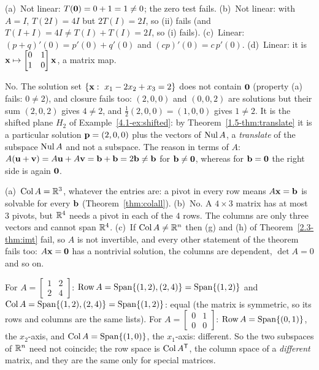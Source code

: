 \documentclass[11pt]{article}
\begin{document}
\begin{description}[leftmargin=0pt,itemsep=5pt]
  \item[Knowledge Check \ref{kc:islinear}.] (a)~Not linear: $T(\mathbf{0})=0+1=1\neq0$; the zero test fails. (b)~Not linear: with $A=I$, $T(2I)=4I$ but $2T(I)=2I$, so (ii) fails (and $T(I+I)=4I\neq T(I)+T(I)=2I$, so (i) fails). (c)~Linear: $(p+q)'(0)=p'(0)+q'(0)$ and $(cp)'(0)=c\,p'(0)$. (d)~Linear: it is $\mathbf{x}\mapsto\begin{bmatrix}0&1\\1&0\end{bmatrix}\mathbf{x}$, a matrix map.
  \item[Pause and think \ref{think:shifted}.] No. The solution set $\{\bv{x}:\ x_1-2x_2+x_3=2\}$ does not contain $\mathbf{0}$ (property (a) fails: $0\neq2$), and closure fails too: $(2,0,0)$ and $(0,0,2)$ are solutions but their sum $(2,0,2)$ gives $4\neq2$, and $\tfrac12(2,0,0)=(1,0,0)$ gives $1\neq2$. It is the shifted plane $H_2$ of Example~\ref{4.1-ex:shifted}: by Theorem~\ref{1.5-thm:translate} it is a particular solution $\mathbf{p}=(2,0,0)$ plus the vectors of $\operatorname{Nul} A$, a \emph{translate} of the subspace $\operatorname{Nul} A$ and not a subspace. The reason in terms of $A$: $A(\mathbf{u}+\mathbf{v})=A\mathbf{u}+A\mathbf{v}=\mathbf{b}+\mathbf{b}=2\mathbf{b}\neq\mathbf{b}$ for $\mathbf{b}\neq\mathbf{0}$, whereas for $\mathbf{b}=\mathbf{0}$ the right side is again $\mathbf{0}$.
  \item[Pause and think \ref{think:colall}.] (a)~$\operatorname{Col} A=\mathbb{R}^3$, whatever the entries are: a pivot in every row means $A\mathbf{x}=\mathbf{b}$ is solvable for every $\mathbf{b}$ (Theorem~\ref{thm:colall}). (b)~No. A $4\times3$ matrix has at most $3$ pivots, but $\mathbb{R}^4$ needs a pivot in each of the $4$ rows. The columns are only three vectors and cannot span $\mathbb{R}^4$. (c)~If $\operatorname{Col} A\neq\mathbb{R}^n$ then (g) and (h) of Theorem~\ref{2.3-thm:imt} fail, so $A$ is not invertible, and every other statement of the theorem fails too: $A\mathbf{x}=\mathbf{0}$ has a nontrivial solution, the columns are dependent, $\det A=0$ and so on.
  \item[Pause and think \ref{think:rowcol}.] For $A=\begin{bmatrix}1&2\\2&4\end{bmatrix}$: $\operatorname{Row} A=\operatorname{Span}\{(1,2),(2,4)\}=\operatorname{Span}\{(1,2)\}$ and $\operatorname{Col} A=\operatorname{Span}\{(1,2),(2,4)\}=\operatorname{Span}\{(1,2)\}$: equal (the matrix is symmetric, so its rows and columns are the same lists). For $A=\begin{bmatrix}0&1\\0&0\end{bmatrix}$: $\operatorname{Row} A=\operatorname{Span}\{(0,1)\}$, the $x_2$-axis, and $\operatorname{Col} A=\operatorname{Span}\{(1,0)\}$, the $x_1$-axis: different. So the two subspaces of $\mathbb{R}^n$ need not coincide; the row space is $\operatorname{Col} A^{\mathsf T}$, the column space of a \emph{different} matrix, and they are the same only for special matrices.

\end{description}
\end{document}
